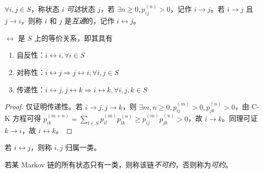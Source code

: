 \documentclass[../main.tex]{subfiles}
\begin{document}
\begin{definition}\label{def:7.3.1}
    $\forall i,j\in S$，称状态 $i$ \emph{可达}状态 $j$，若 $\exists n\geq0,p_{ij}^{(n)}>0$，记作 $i\rightarrow j$。若 $i\rightarrow j$ 且 $j\rightarrow i$，则称 $i$ 和 $j$ 是\emph{互通}的，记作 $i\leftrightarrow j$。
\end{definition}

\begin{proposition}
    $\leftrightarrow$ 是 $S$ 上的等价关系，即其具有
    \begin{enumerate}
        \item 自反性：$i\leftrightarrow i,\forall i\in S$
        \item 对称性：$i\leftrightarrow j\Rightarrow j\leftrightarrow i,\forall i,j\in S$
        \item 传递性：$i\leftrightarrow j,j\leftrightarrow k\Rightarrow i\leftrightarrow k,\forall i,j,k\in S$
    \end{enumerate}
\end{proposition}

\begin{proof}
    仅证明传递性。若 $i\rightarrow j,j\rightarrow k$，则 $\exists m,n\geq0,p_{ij}^{(m)}>0,p_{jk}^{(n)}>0$，由 C-K 方程可得 $p_{ik}^{(m+n)}=\sum_{l\in S}p_{il}^{(m)}p_{lk}^{(n)}\geq p_{ij}^{(m)}p_{jk}^{(n)}>0$，故 $i\rightarrow k$。同理可证 $k\rightarrow i$，故 $i\leftrightarrow k$。
\end{proof}

若 $i\leftrightarrow j$，则称 $i,j$ 归属一类。

\begin{definition}\label{def:7.3.2}
    若某 Markov 链的所有状态只有一类，则称该链\emph{不可约}，否则称为\emph{可约}。
\end{definition}
\end{document}
